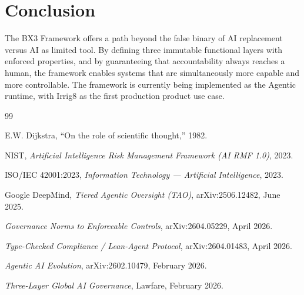 \documentclass[11pt, a4paper]{article}
\begin{document}
\section{Conclusion}
The BX3 Framework offers a path beyond the false binary of AI replacement versus AI as limited tool. By defining three immutable functional layers with enforced properties, and by guaranteeing that accountability always reaches a human, the framework enables systems that are simultaneously more capable and more controllable. The framework is currently being implemented as the Agentic runtime, with Irrig8 as the first production product use case.
\begin{thebibliography}{99}
\item E.W. Dijkstra, ``On the role of scientific thought,'' 1982.
\item NIST, \textit{Artificial Intelligence Risk Management Framework (AI RMF 1.0)}, 2023.
\item ISO/IEC 42001:2023, \textit{Information Technology --- Artificial Intelligence}, 2023.
\item Google DeepMind, \textit{Tiered Agentic Oversight (TAO)}, arXiv:2506.12482, June 2025.
\item \textit{Governance Norms to Enforceable Controls}, arXiv:2604.05229, April 2026.
\item \textit{Type-Checked Compliance / Lean-Agent Protocol}, arXiv:2604.01483, April 2026.
\item \textit{Agentic AI Evolution}, arXiv:2602.10479, February 2026.
\item \textit{Three-Layer Global AI Governance}, Lawfare, February 2026.
\end{thebibliography}
\end{document}
